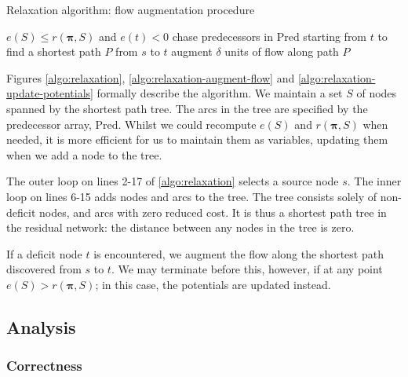 \begin{algorithm}
    \caption{Relaxation algorithm: flow augmentation procedure}
    \label{algo:relaxation-augment-flow}
    \begin{algorithmic}[1]
        \Require $e(S) \leq r(\boldsymbol{\pi},S)$ and $e(t) < 0$
        \Statex
        \State chase predecessors in $\mathrm{Pred}$ starting from $t$ to find a shortest path $P$ from $s$ to $t$
        \State augment $\delta$ units of flow along path $P$
        \EndFunction
    \end{algorithmic}
\end{algorithm}

Figures \ref{algo:relaxation}, \ref{algo:relaxation-augment-flow} and \ref{algo:relaxation-update-potentials} formally describe the algorithm. We maintain a set $S$ of nodes spanned by the shortest path tree. The arcs in the tree are specified by the predecessor array, $\mathrm{Pred}$. Whilst we could recompute $e(S)$ and $r(\boldsymbol{\pi},S)$ when needed, it is more efficient for us to maintain them as variables, updating them when we add a node to the tree.

The outer loop on lines 2-17 of \ref{algo:relaxation} selects a source node $s$. The inner loop on lines 6-15 adds nodes and arcs to the tree. The tree consists solely of non-deficit nodes, and arcs with zero reduced cost. It is thus a shortest path tree in the residual network: the distance between any nodes in the tree is zero\footnotemark.

If a deficit node $t$ is encountered, we augment the flow along the shortest path discovered from $s$ to $t$. We may terminate before this, however, if at any point $e(S) > r(\boldsymbol{\pi},S)$; in this case, the potentials are updated instead.

\subsection{Analysis}

\subsubsection{Correctness}

